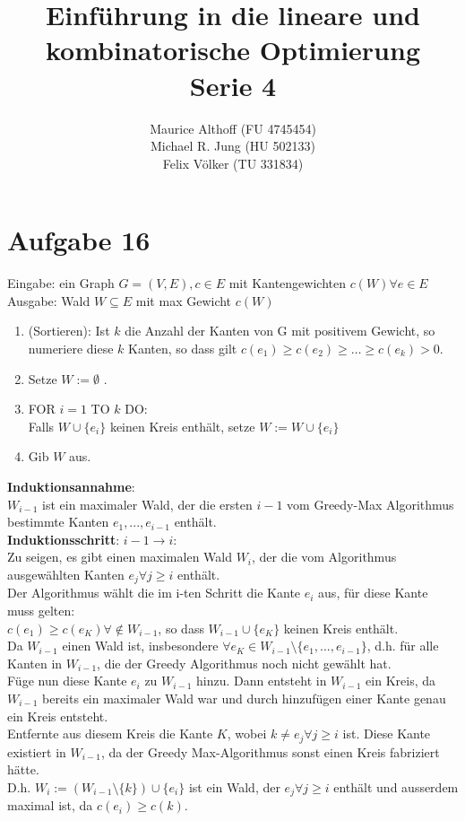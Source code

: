 \documentclass[a4paper,10pt,german]{scrartcl}
\title{Einführung in die lineare und kombinatorische Optimierung\\
Serie 4}
\author{Maurice Althoff (FU 4745454)\\Michael R. Jung (HU 502133)\\Felix Völker (TU 331834)}
\begin{document}
\maketitle

\section{Aufgabe 16}

Eingabe: ein Graph $ G=(V,E), c \in E $ mit Kantengewichten $c(W) \forall e \in E$ \\
Ausgabe: Wald $W \subseteq E$ mit max Gewicht $c(W)$ \\
\begin{enumerate}\itemsep1pt \parskip0pt 
\item (Sortieren): Ist $k$ die Anzahl der Kanten von G mit positivem Gewicht, so numeriere diese $k$ Kanten, so dass gilt $ c(e_1) \geq c(e_2) \geq \ldots \geq c(e_k) > 0$.\\
\item Setze $W := \emptyset $ .\\
\item FOR $i=1$ TO $k$ DO: \\
\-\hspace{1cm} Falls $W \cup \{ e_i\}$ keinen Kreis enth\"alt, setze $W:=W \cup \{ e_i\} $ \\
\item Gib $W$ aus.
\end{enumerate}

\textbf{Induktionsannahme}: \\
$W_{i-1}$ ist ein maximaler Wald, der die ersten $i-1$ vom Greedy-Max Algorithmus bestimmte Kanten $e_1, ..., e_{i-1}$ enth\"alt.\\
\textbf{Induktionsschritt}: $i-1 \rightarrow i$: \\
Zu seigen, es gibt einen maximalen Wald $W_i$, der die vom Algorithmus ausgew\"ahlten Kanten $e_j \forall j\geq i$ enth\"alt.\\
Der Algorithmus w\"ahlt die im i-ten Schritt die Kante $e_i$ aus, f\"ur diese Kante muss gelten: \\
$c(e_1) \geq c(e_K) \forall \notin W_{i-1}$, so dass $W_{i-1} \cup \{ e_K\}$ keinen Kreis enth\"alt.\\
Da $W_{i-1}$ einen Wald ist, insbesondere $\forall e_K \in W_{i-1} \setminus \{ e_1, ..., e_{i-1}\}$, d.h. f\"ur alle Kanten in $W_{i-1}$, die der Greedy Algorithmus noch nicht gew\"ahlt hat.\\
F\"uge nun diese Kante $e_i$ zu $W_{i-1}$ hinzu. Dann entsteht in $W_{i-1}$ ein Kreis, da $W_{i-1}$ bereits ein maximaler Wald war und durch hinzuf\"ugen einer Kante genau ein Kreis entsteht.\\
Entfernte aus diesem Kreis die Kante $K$, wobei $k \neq e_j \forall j \geq i$ ist. Diese Kante existiert in $W_{i-1}$, da der Greedy Max-Algorithmus sonst einen Kreis fabriziert h\"atte.\\
D.h. $W_i := ( W_{i-1} \setminus \{ k\} ) \cup \{ e_i\} $ ist ein Wald, der $e_j \forall j \geq i$ enth\"alt und ausserdem maximal ist, da $c(e_i) \geq c(k)$.
\end{document}
